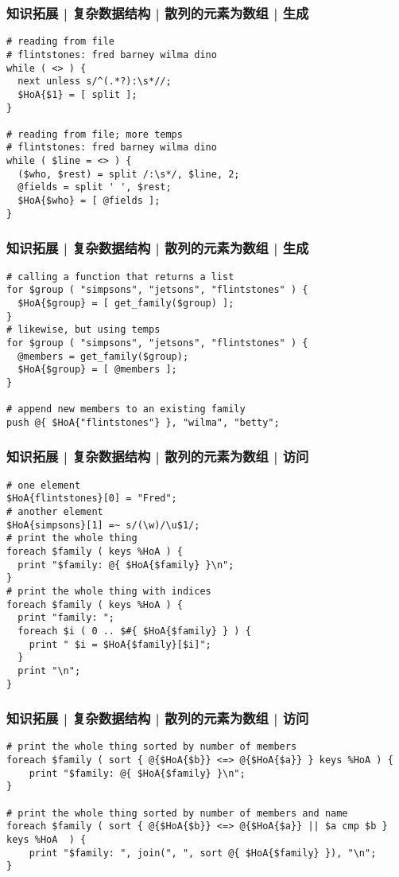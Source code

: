 \begin{frame}[fragile]
  \frametitle{知识拓展 | 复杂数据结构 | 散列的元素为数组 | 生成}
\begin{lstlisting}
# reading from file
# flintstones: fred barney wilma dino
while ( <> ) {
  next unless s/^(.*?):\s*//;
  $HoA{$1} = [ split ];
}

# reading from file; more temps
# flintstones: fred barney wilma dino
while ( $line = <> ) {
  ($who, $rest) = split /:\s*/, $line, 2;
  @fields = split ' ', $rest;
  $HoA{$who} = [ @fields ];
}
\end{lstlisting}
\end{frame}

\begin{frame}[fragile]
  \frametitle{知识拓展 | 复杂数据结构 | 散列的元素为数组 | 生成}
\begin{lstlisting}
# calling a function that returns a list
for $group ( "simpsons", "jetsons", "flintstones" ) {
  $HoA{$group} = [ get_family($group) ];
}
# likewise, but using temps
for $group ( "simpsons", "jetsons", "flintstones" ) {
  @members = get_family($group);
  $HoA{$group} = [ @members ];
}

# append new members to an existing family
push @{ $HoA{"flintstones"} }, "wilma", "betty";
\end{lstlisting}
\end{frame}

\begin{frame}[fragile]
  \frametitle{知识拓展 | 复杂数据结构 | 散列的元素为数组 | 访问}
  \vspace{-0.8em}
\begin{lstlisting}
# one element
$HoA{flintstones}[0] = "Fred";
# another element
$HoA{simpsons}[1] =~ s/(\w)/\u$1/;
# print the whole thing
foreach $family ( keys %HoA ) {
  print "$family: @{ $HoA{$family} }\n";
}
# print the whole thing with indices
foreach $family ( keys %HoA ) {
  print "family: ";
  foreach $i ( 0 .. $#{ $HoA{$family} } ) {
    print " $i = $HoA{$family}[$i]";
  }
  print "\n";
}
\end{lstlisting}
\end{frame}

\begin{frame}[fragile]
  \frametitle{知识拓展 | 复杂数据结构 | 散列的元素为数组 | 访问}
\begin{lstlisting}
# print the whole thing sorted by number of members
foreach $family ( sort { @{$HoA{$b}} <=> @{$HoA{$a}} } keys %HoA ) {
    print "$family: @{ $HoA{$family} }\n";
}

# print the whole thing sorted by number of members and name
foreach $family ( sort { @{$HoA{$b}} <=> @{$HoA{$a}} || $a cmp $b } keys %HoA  ) {
    print "$family: ", join(", ", sort @{ $HoA{$family} }), "\n";
}
\end{lstlisting}
\end{frame}


